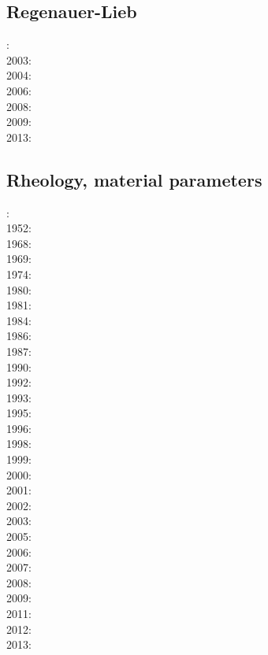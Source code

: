 \subsection*{Regenauer-Lieb}

: \cite{reyu00}\\
2003: \cite{reyu03}\\
2004: \cite{reyu04}\\
2006: \cite{rehy06}\cite{rewr06}\\
2008: \cite{rerw08}\\
2009: \cite{reps09}\\
2013: \cite{revp13}

\subsection*{Rheology, material parameters}

: \cite{druc51}\cite{hafn51}\\
1952: \cite{drpr52}\\
1968: \cite{byer68}\\
1969: \cite{hand69}\\
1974: \cite{kogo74}\\
1980: \cite{brko80}\\
1981: \cite{delo81}\\
1984: \cite{rafi84}\cite{chpa84}\\
1986: \cite{kapf86}\\
1987: \cite{kikr87}\\
1990: \cite{wica90}\\
1992: \cite{bako92}\cite{chbo92}\cite{kali92}\cite{kohl92}\\
1993: \cite{kawu93}\\
1995: \cite{koem95}\\
1996: \cite{wasd96}\\
1998: \cite{copo98}\\
1999: \cite{kayk99}\\
2000: \cite{rydr00}\cite{rana00}\\
2001: \cite{lova01}\\
2002: \cite{hirt02}\\
2003: \cite{hiko03}\cite{kaju03}\cite{mohi03}\\
2005: \cite{didr05}\cite{drur05}\\
2006: \cite{rygw06}\cite{buwa06}\\
2007: \cite{hirw07}\cite{kohl07}\\
2008: \cite{lemm08}\cite{budr08}\cite{koka08}\\
2009: \cite{kayk09}\cite{kako09}\\
2011: \cite{lell11}\cite{kemk11}\\
2012: \cite{reyn12}\\
2013: \cite{lepo13}\cite{miam13}


